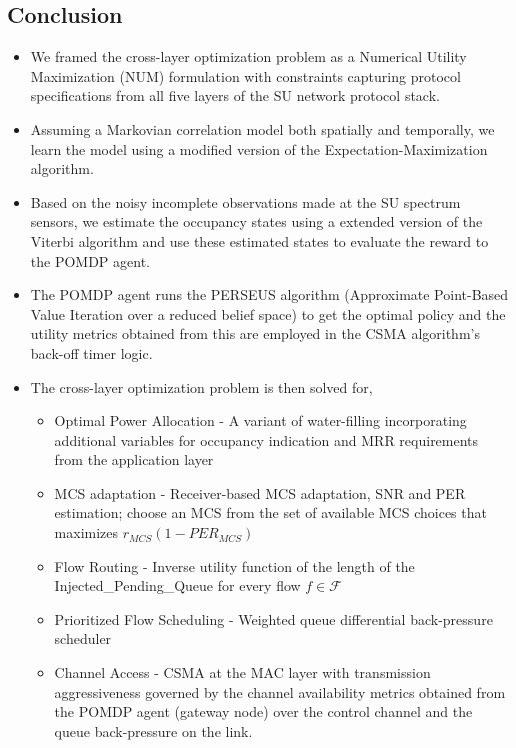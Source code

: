 \documentclass[12pt, draftcls, onecolumn]{IEEEtran}
\begin{document}
\subsection{Conclusion}
\begin{itemize}
    \item We framed the cross-layer optimization problem as a Numerical Utility Maximization (NUM) formulation with constraints capturing protocol specifications from all five layers of the SU network protocol stack.
    \item Assuming a Markovian correlation model both spatially and temporally, we learn the model using a modified version of the Expectation-Maximization algorithm.
    \item Based on the noisy incomplete observations made at the SU spectrum sensors, we estimate the occupancy states using a extended version of the Viterbi algorithm and use these estimated states to evaluate the reward to the POMDP agent.
    \item The POMDP agent runs the PERSEUS algorithm (Approximate Point-Based Value Iteration over a reduced belief space) to get the optimal policy and the utility metrics obtained from this are employed in the CSMA algorithm's back-off timer logic.
    \item The cross-layer optimization problem is then solved for,
    \begin{itemize}
        \item Optimal Power Allocation - A variant of water-filling incorporating additional variables for occupancy indication and MRR requirements from the application layer
        \item MCS adaptation - Receiver-based MCS adaptation, SNR and PER estimation; choose an MCS from the set of available MCS choices that maximizes $r_{MCS}(1 - PER_{MCS})$
        \item Flow Routing - Inverse utility function of the length of the Injected\_Pending\_Queue for every flow $f \in \mathcal{F}$
        \item Prioritized Flow Scheduling - Weighted queue differential back-pressure scheduler
        \item Channel Access - CSMA at the MAC layer with transmission aggressiveness governed by the channel availability metrics obtained from the POMDP agent (gateway node) over the control channel and the queue back-pressure on the link.
    \end{itemize}
\end{itemize}
\end{document}
